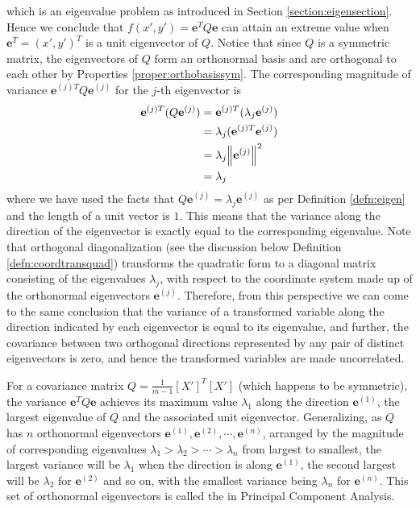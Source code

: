 which is an eigenvalue problem as introduced in Section \ref{section:eigensection}. Hence we conclude that $f(x',y') = \textbf{e}^T Q \textbf{e}$ can attain an extreme value when $\textbf{e}^T = (x',y')^T$ is a unit eigenvector of $Q$. Notice that since $Q$ is a symmetric matrix, the eigenvectors of $Q$ form an orthonormal basis and are orthogonal to each other by Properties \ref{proper:orthobasissym}. The corresponding magnitude of variance ${\textbf{e}^{(j)T}} Q \textbf{e}^{(j)}$ for the $j$-th eigenvector is
\begin{align}
\textbf{e}^{(j)T} (Q \textbf{e}^{(j)}) &= \textbf{e}^{(j)T} (\lambda_j \textbf{e}^{(j)}) \nonumber \\
&= \lambda_j (\textbf{e}^{(j)T} \textbf{e}^{(j)}) \nonumber \\
&= \lambda_j \norm{\textbf{e}^{(j)}}^2 \nonumber \\
&= \lambda_j 
\end{align}
where we have used the facts that $Q \textbf{e}^{(j)} = \lambda_j \textbf{e}^{(j)}$ as per Definition \ref{defn:eigen} and the length of a unit vector is $1$. This means that the variance along the direction of the eigenvector is exactly equal to the corresponding eigenvalue. Note that orthogonal diagonalization (see the discussion below Definition \ref{defn:coordtransquad}) transforms the quadratic form to a diagonal matrix consisting of the eigenvalues $\lambda_j$, with respect to the coordinate system made up of the orthonormal eigenvectors $\textbf{e}^{(j)}$. Therefore, from this perspective we can come to the same conclusion that the variance of a transformed variable along the direction indicated by each eigenvector is equal to its eigenvalue, and further, the covariance between two orthogonal directions represented by any pair of distinct eigenvectors is zero, and hence the transformed variables are made uncorrelated. 
\begin{thm}
\label{thm:PCA}
For a covariance matrix $Q = \frac{1}{m-1}[X']^T[X']$ (which happens to be symmetric), the variance $\textbf{e}^T Q \textbf{e}$ achieves its maximum value $\lambda_1$ along the direction $\textbf{e}^{(1)}$, the largest eigenvalue of $Q$ and the associated unit eigenvector. Generalizing, as $Q$ has $n$ orthonormal eigenvectors $\textbf{e}^{(1)}, \textbf{e}^{(2)}, \cdots, \textbf{e}^{(n)}$, arranged by the magnitude of corresponding eigenvalues $\lambda_1 > \lambda_2 > \cdots > \lambda_n$ from largest to smallest, the largest variance will be $\lambda_1$ when the direction is along $\textbf{e}^{(1)}$, the second largest will be $\lambda_2$ for $\textbf{e}^{(2)}$ and so on, with the smallest variance being $\lambda_n$ for $\textbf{e}^{(n)}$. This set of orthonormal eigenvectors is called the  in Principal Component Analysis.
\end{thm}
